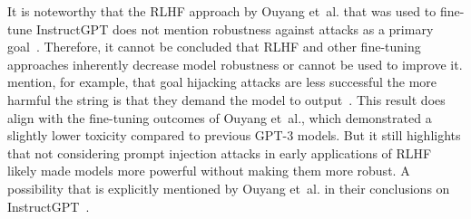 It is noteworthy that the RLHF approach by Ouyang et~al. that was used to fine-tune InstructGPT does not mention robustness against attacks as a primary goal~\cite{ouyang_training_2022}.
Therefore, it cannot be concluded that RLHF and other fine-tuning approaches inherently decrease model robustness or cannot be used to improve it.
\perez mention, for example, that goal hijacking attacks are less successful the more harmful the string is that they demand the model to output~\cite{perez_ignore_2022}.
This result does align with the fine-tuning outcomes of Ouyang et~al., which demonstrated a slightly lower toxicity compared to previous GPT-3 models.
But it still highlights that not considering prompt injection attacks in early applications of RLHF likely made models more powerful without making them more robust.
A possibility that is explicitly mentioned by Ouyang et~al. in their conclusions on InstructGPT~\cite{ouyang_training_2022}.\\